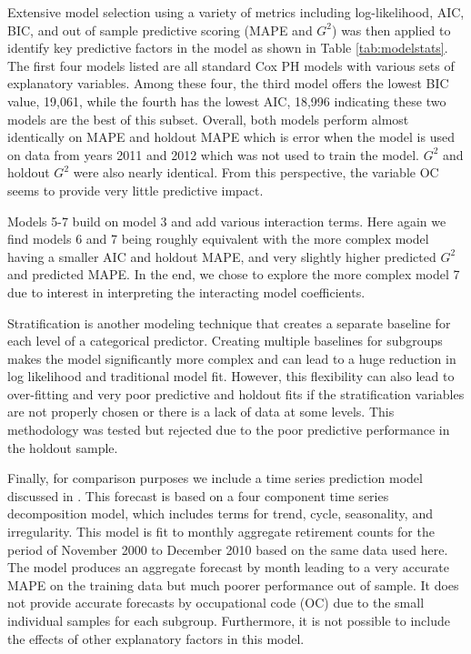 \documentclass[12pt,letterpaper]{article}
\begin{document}
Extensive model selection using a variety of metrics including log-likelihood, AIC, BIC, and out of sample predictive scoring (MAPE and $G^2$) was then applied to identify key predictive factors in the model as shown in Table \ref{tab:modelstats}. %
The first four models listed are all standard Cox PH models with various sets of explanatory variables.  Among these four, the third model offers the lowest BIC value, 19,061, while the fourth has the lowest AIC, 18,996 indicating these two models are the best of this subset.  Overall, both models perform almost identically on MAPE and holdout MAPE which is error when the model is used on data from years 2011 and 2012 which was not used to train the model. $G^2$ and holdout $G^2$ were also nearly identical.  From this perspective, the variable OC seems to provide very little predictive impact.

Models 5-7 build on model 3 and add various interaction terms.  Here again we find models 6 and 7 being roughly equivalent with the more complex model having a smaller AIC and holdout MAPE, and very slightly higher predicted $G^2$ and predicted MAPE.  In the end, we chose to explore the more complex model 7 due to interest in interpreting the interacting model coefficients.

Stratification is another modeling technique that creates a separate baseline for each level of a categorical predictor.  Creating multiple baselines for subgroups makes the model significantly more complex and can lead to a huge reduction in log likelihood and traditional model fit.  However, this flexibility can also lead to over-fitting and very poor predictive and holdout fits if the stratification variables are not properly chosen or there is a lack of data at some levels.  This methodology was tested but rejected due to the poor predictive performance in the holdout sample.

Finally, for comparison purposes we include a time series prediction model discussed in \cite{zhu2015}.  This forecast is based on a four component time series decomposition model, which includes terms for trend, cycle, seasonality, and irregularity.  This model is fit to monthly aggregate retirement counts for the period of November 2000 to December 2010 based on the same data used here. The model produces an aggregate forecast by month leading to a very accurate MAPE on the training data but much poorer performance out of sample. It does not provide accurate forecasts by occupational code (OC) due to the small individual samples for each subgroup. Furthermore, it is not possible to include the effects of other explanatory factors in this model.
\end{document}
